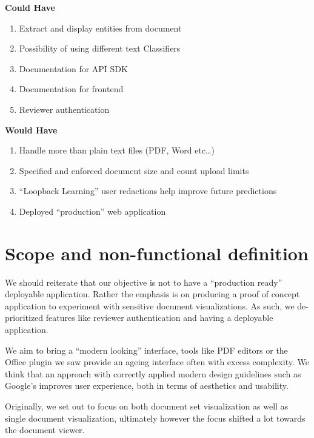 \documentclass{l4proj}
\begin{document}
\begin{minipage}[t]{.5\linewidth}
    \centerline{\textbf{Could Have}}
    \begin{enumerate}[label=\textbf{C\arabic*}]
        \item Extract and display entities from document
        \item Possibility of using different text Classifiers
        \item Documentation for API SDK
        \item Documentation for frontend
        \item Reviewer authentication
    \end{enumerate}
\end{minipage}
\hfill
\noindent
\begin{minipage}[t]{.5\linewidth}
    \centerline{\textbf{Would Have}}
    \begin{enumerate}[label=\textbf{W\arabic*}]
        \item Handle more than plain text files (PDF, Word etc…)
        \item Specified and enforced document size and count upload limits
        \item ``Loopback Learning'' user redactions help improve future predictions
        \item Deployed ``production'' web application
    \end{enumerate}
\end{minipage}

\section{Scope and non-functional definition}

We should reiterate that our objective is not to have a ``production ready'' deployable application.
Rather the emphasis is on producing a proof of concept application to experiment with sensitive document visualizations.
As such, we de-prioritized features like reviewer authentication and having a deployable application.

We aim to bring a ``modern looking'' interface, tools like PDF editors or the Office plugin we saw provide an ageing interface often with excess complexity.
We think that an approach with correctly applied modern design guidelines such as Google's \textcite{MaterialDesign} improves user experience, both in terms of aesthetics and usability.

Originally, we set out to focus on both document set visualization as well as single document visualization, ultimately however the focus shifted a lot towards the document viewer.
\end{document}
